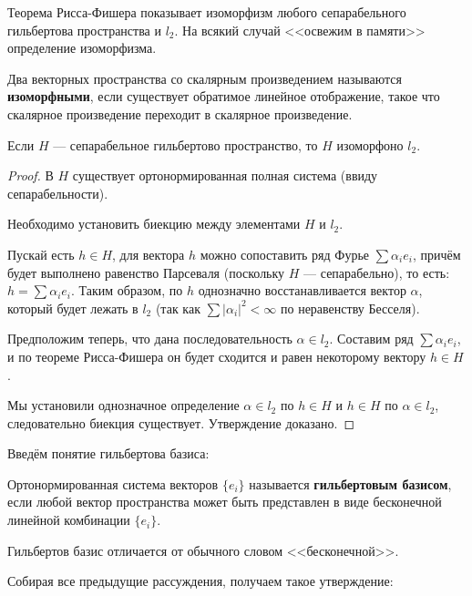 \documentclass[12pt]{article}
\begin{document}
			Теорема Рисса-Фишера показывает изоморфизм любого сепарабельного гильбертова пространства и
			$l_2$. На всякий случай <<освежим в памяти>> определение изоморфизма.
	
			\begin{defi}
				Два векторных пространства со скалярным произведением называются 
				\textbf{изоморфными}, если существует обратимое линейное отображение, 
				такое что скалярное произведение переходит в скалярное произведение.
			\end{defi}

			\begin{state}
				Если $H$ --- сепарабельное гильбертово пространство, то $H$ изоморфоно $l_2$.
			\end{state}
			\begin{proof}
				В $H$ существует ортонормированная полная система (ввиду сепарабельности).
				
				Необходимо установить биекцию между элементами $H$ и $l_2$.

				Пускай есть $h \in H$, для вектора $h$ можно сопоставить ряд Фурье $\sum \alpha_i e_i$, причём будет выполнено равенство Парсеваля (поскольку $H$ --- сепарабельно), то есть: $h = \sum \alpha_i e_i$. Таким образом, по $h$ однозначно восстанавливается вектор $\alpha$, который будет лежать в $l_2$ (так как $\sum |\alpha_i|^2 < \infty$ по неравенству Бесселя).

				Предположим теперь, что дана последовательность $\alpha \in l_2$. Составим ряд $\sum \alpha_i e_i$, и по теореме Рисса-Фишера он будет сходится и равен некоторому вектору $h \in H$.

				Мы установили однозначное определение $\alpha \in l_2$ по $h \in H$ и $h \in H$ по $\alpha \in l_2$, следовательно биекция существует. Утверждение доказано.
			\end{proof}

			Введём понятие гильбертова базиса:
			\begin{defi}
				Ортонормированная система векторов $\{ e_i \}$ называется \textbf{гильбертовым базисом}, если
				любой вектор
				пространства может быть представлен в виде бесконечной линейной комбинации $ \{ e_i \} $.
			\end{defi}
	
			{\color{gray} Гильбертов базис отличается от обычного словом <<бесконечной>>.}

			Собирая все предыдущие рассуждения, получаем такое утверждение:
\end{document}
